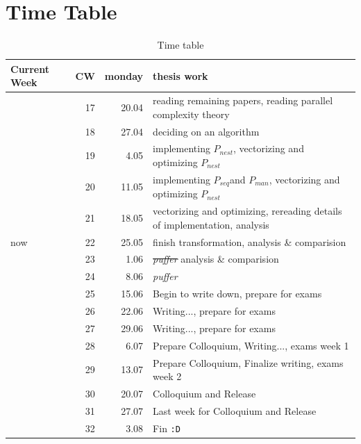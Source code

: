 \documentclass{article}
\newcommand{\seq}[0]{$P_{seq}$}
\newcommand{\man}[0]{$P_{man}$}
\newcommand{\ndpn}[0]{$P_{nest}$}
\begin{document}
  \section{Time Table}
    \begin{table}[h]
      \begin{center}
      \caption{Time table} %
      \label{timetable}
      \begin{tabular}{lrrl}
        \toprule
        Current Week & CW & monday & thesis work \\
        \midrule
            & 17 & 20.04 & reading remaining papers, reading parallel complexity theory \\
            & 18 & 27.04 & deciding on an algorithm  \\
            & 19 & 4.05  & implementing \ndpn, vectorizing and optimizing \ndpn \\
            & 20 & 11.05 & implementing \seq and \man, vectorizing and optimizing \ndpn \\
            & 21 & 18.05 & vectorizing and optimizing, rereading details of implementation, analysis \\
        now & 22 & 25.05 & finish transformation, analysis \& comparision\\
            & 23 & 1.06  & \sout{\textit{puffer}} analysis \& comparision \\
            & 24 & 8.06  & \textit{puffer} \\
            & 25 & 15.06 & Begin to write down, prepare for exams\\
            & 26 & 22.06 & Writing..., prepare for exams \\
            & 27 & 29.06 & Writing..., prepare for exams \\
            & 28 & 6.07  & Prepare Colloquium, Writing..., exams week 1 \\
            & 29 & 13.07 & Prepare Colloquium, Finalize writing, exams week 2 \\
            & 30 & 20.07 & Colloquium and Release \\
            & 31 & 27.07 & Last week for Colloquium and Release \\
            & 32 & 3.08  & Fin \texttt{:D} \\
      \end{tabular}
      \end{center}
    \end{table}
  
\end{document}
